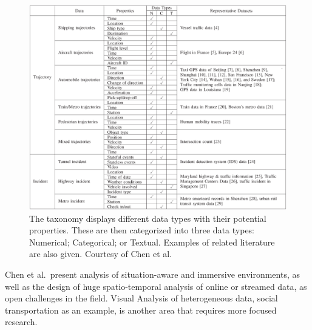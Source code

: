 \begin{figure}[t]
\begin{center}
\includegraphics[width=1\textwidth]{images/chen2015survey.png}
\caption{The taxonomy displays different data types with their potential properties. These are then categorized into three data types: Numerical; Categorical; or Textual. Examples of related literature are also given. Courtesy of Chen et al.\ \cite{chen2015survey}}
\end{center}
\end{figure}


Chen et al.\ present analysis of situation-aware and immersive environments, as well as the design of huge spatio-temporal analysis of online or streamed data, as open challenges in the field. Visual Analysis of heterogeneous data, social transportation as an example, is another area that requires more focused research.

